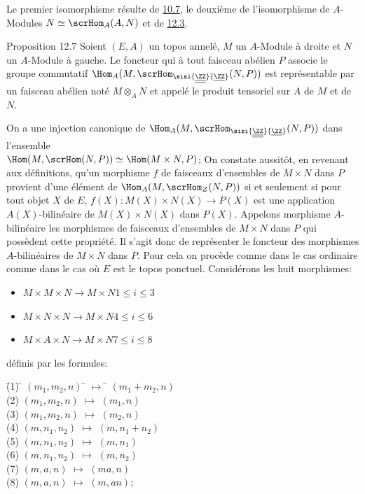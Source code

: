 \documentclass[10pt]{../fichiers-configuration-latex/smfart}
\begin{document}
Le premier isomorphisme résulte de \hyperref[IV.cor10.7]{10.7}, le deuxième de
l'isomorphisme de $A$-Modules $N\simeq \scrHom_A(A,N)$ et de
\hyperref[IV.prop12.3]{12.3}.

\begin{enonce*}{Proposition 12.7}
Soient $(E,A)$ un topos annelé, $M$ un $A$-Module à droite et $N$ un
$A$-Module à gauche. Le foncteur qui à tout faisceau abélien $P$
associe le groupe commutatif
$\Hom_A(M,\scrHom_{\sisi{\underline{\underline{\ZZ}}}{\underline{\ZZ}}}(N,P))$ est représentable par
un faisceau abélien noté $M\otimes_A N$ et appelé le produit
tensoriel sur $A$ de $M$ et de $N$.
\end{enonce*}

On a une injection canonique de $\Hom_A(M,\scrHom_{\sisi{\underline{\underline{\ZZ}}}{\underline{\ZZ}}}(N,P))$ dans
l'ensemble \\ $\Hom(M,\scrHom(N,P))\simeq \Hom(M\times N, P)$; On
constate aussitôt, en revenant aux définitions, qu'un morphisme $f$
de faisceaux d'ensembles de $M\times N$ dans $P$ provient d'une
élément de $\Hom_A(M,\scrHom_Z(N,P))$ si et seulement si pour tout
objet $X$ de $E$, $f(X):M(X)\times N(X)\rightarrow P(X)$ est une
application\pageoriginale $A(X)$-bilinéaire de $M(X)\times N(X)$
dans $P(X)$. Appelons morphisme $A$-bilinéaire les morphismes de
faisceaux d'ensembles de $M\times N$ dans $P$ qui possèdent cette
propriété. Il s'agit donc de représenter le foncteur des morphismes
$A$-bilinéaires de $M\times N$ dans $P$. Pour cela on procède comme
dans le cas ordinaire \ie comme dans le cas où $E$ est le topos
ponctuel. Considérons les huit morphismes:
\begin{itemize}
\item[(i):] $M\times M\times N \longrightarrow M\times N$\qquad $1\leq
i\leq 3$

\item[(i):] $M\times N\times N\longrightarrow M\times N$\qquad $4\leq
i\leq 6$

\item[(i):] $M\times A\times N\longrightarrow M\times N$\qquad $7\leq
i\leq 8$
\end{itemize}
définis par les formules:
\begin{tabbing}
\quad\= (1) \= $(m_1, m_2, n)$ \= $\longmapsto$ \= $(m_1+m_2, n)$\\
\> (2) \> $(m_1, m_2, n)$ \> $\longmapsto$ \> $(m_1, n)$\\
\> (3) \> $(m_1, m_2, n)$ \> $\longmapsto$ \> $(m_2, n)$\\
\> (4) \> $(m, n_1, n_2)$ \> $\longmapsto$ \> $(m, n_1+n_2)$\\
\> (5) \> $(m, n_1, n_2)$ \> $\longmapsto$ \> $(m, n_1)$\\
\> (6) \> $(m, n_1, n_2)$ \> $\longmapsto$ \> $(m, n_2)$\\
\> (7) \> $(m, a, n)$ \> $\longmapsto$ \> $(ma, n)$\\
\> (8) \> $(m, a, n)$ \> $\longmapsto$ \> $(m, an)$;
\end{tabbing}
\end{document}
